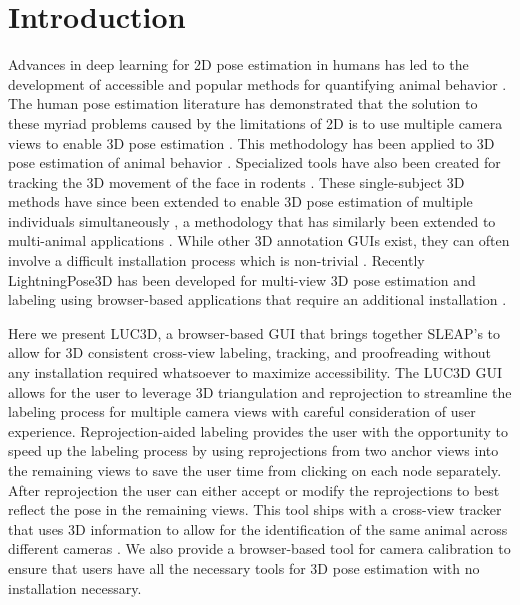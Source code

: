 \documentclass[pdflatex, sn-nature]{sn-jnl}
\theoremstyle{thmstyleone}%
\theoremstyle{thmstyletwo}%
\theoremstyle{thmstylethree}%
\begin{document}
\section{Introduction}\label{sec1}

Advances in deep learning for 2D pose estimation in humans has led to the development of accessible and popular methods for quantifying animal behavior \citep{Mathis2018,Pereira2020,Pereira2022,Biderman2024}. The human pose estimation literature has demonstrated that the solution to these myriad problems caused by the limitations of 2D is to use multiple camera views to enable 3D pose estimation \citep{Iskakov2019}. This methodology has been applied to 3D pose estimation of animal behavior \citep{Dunn2021,Karashchuk2021}. Specialized tools have also been created for tracking the 3D movement of the face in rodents \citep{Daruwalla2026}. These single-subject 3D methods have since been extended to enable 3D pose estimation of multiple individuals simultaneously \citep{Huang2020,Chen2020}, a methodology that has similarly been extended to multi-animal applications \citep{Marshall2021,Marshall2022}. While other 3D annotation GUIs exist, they can often involve a difficult installation process which is non-trivial \citep{Hueser2023}. Recently LightningPose3D has been developed for multi-view 3D pose estimation and labeling using browser-based applications that require an additional installation \citep{Aharon2026}. 

Here we present LUC3D, a browser-based GUI that brings together SLEAP's to allow for 3D consistent cross-view labeling, tracking, and proofreading without any installation required whatsoever to maximize accessibility. The LUC3D GUI allows for the user to leverage 3D triangulation and reprojection to streamline the labeling process for multiple camera views with careful consideration of user experience. Reprojection-aided labeling provides the user with the opportunity to speed up the labeling process by using reprojections from two anchor views into the remaining views to save the user time from clicking on each node separately. After reprojection the user can either accept or modify the reprojections to best reflect the pose in the remaining views. This tool ships with a cross-view tracker that uses 3D information to allow for the identification of the same animal across different cameras \citep{Maree2024}. We also provide a browser-based tool for camera calibration to ensure that users have all the necessary tools for 3D pose estimation with no installation necessary. 
\end{document}

